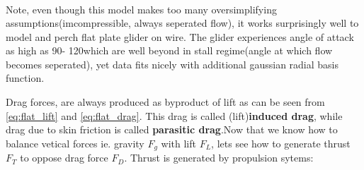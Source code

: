 \begin{align*}
\end{align*}

Note, even though this model makes too many oversimplifying assumptions(imcompressible, always seperated flow), it works surprisingly well to model\cite{cory2008experiments} and perch flat plate glider on wire\cite{moore2014robust}. The glider experiences angle of attack as high as 90\textdegree - 120\textdegree which are well beyond in stall regime(angle at which flow becomes seperated), yet data fits nicely with additional gaussian radial basis function.

Drag forces, are always produced as byproduct of lift as can be seen from \eqref{eq:flat_lift} and \eqref{eq:flat_drag}. This drag is called (lift)\textbf{induced drag}, while drag due to skin friction is called \textbf{parasitic drag}.Now that we know how to balance vetical forces ie. gravity $F_g$ with lift $F_L$, lets see how to generate thrust $F_T$ to oppose drag force $F_D$. Thrust is generated by propulsion sytems:
